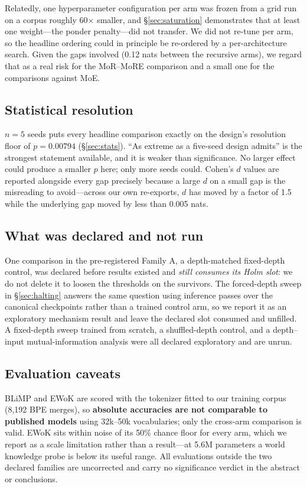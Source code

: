 Relatedly, one hyperparameter configuration per arm was frozen from a grid run on a
corpus roughly 60$\times$ smaller, and \S\ref{sec:saturation} demonstrates that at
least one weight---the ponder penalty---did not transfer. We did not re-tune per
arm, so the headline ordering could in principle be re-ordered by a per-architecture
search. Given the gaps involved (0.12 nats between the recursive arms), we regard
that as a real risk for the MoR--MoRE comparison and a small one for the comparisons
against MoE.

\subsection*{Statistical resolution}

$n = 5$ seeds puts every headline comparison exactly on the design's resolution
floor of $p = 0.00794$ (\S\ref{sec:stats}). ``As extreme as a five-seed design
admits'' is the strongest statement available, and it is weaker than significance.
No larger effect could produce a smaller $p$ here; only more seeds could. Cohen's
$d$ values are reported alongside every gap precisely because a large $d$ on a
small gap is the misreading to avoid---across our own re-exports, $d$ has moved by
a factor of 1.5 while the underlying gap moved by less than 0.005 nats.

\subsection*{What was declared and not run}

One comparison in the pre-registered Family A, a depth-matched fixed-depth control,
was declared before results existed and \emph{still consumes its Holm slot}: we do
not delete it to loosen the thresholds on the survivors. The forced-depth sweep in
\S\ref{sec:halting} answers the same question using inference passes over the
canonical checkpoints rather than a trained control arm, so we report it as an
exploratory mechanism result and leave the declared slot consumed and unfilled. A
fixed-depth sweep trained from scratch, a shuffled-depth control, and a
depth--input mutual-information analysis were all declared exploratory and are
unrun.

\subsection*{Evaluation caveats}

BLiMP and EWoK are scored with the tokenizer fitted to our training corpus
(8{,}192 BPE merges), so \textbf{absolute accuracies are not comparable to
published models} using 32k--50k vocabularies; only the cross-arm comparison is
valid. EWoK sits within noise of its 50\% chance floor for every arm, which we
report as a scale limitation rather than a result---at 5.6M parameters a world
knowledge probe is below its useful range. All evaluations outside the two declared
families are uncorrected and carry no significance verdict in the abstract or
conclusions.

